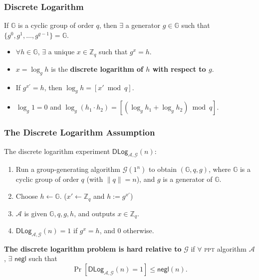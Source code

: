 \begin{frame}\frametitle{Discrete Logarithm}
If $\mathbb{G}$ is a cyclic group of order $q$, then $\exists$ a generator $g \in \mathbb{G}$ such that $\{ g^0,g^1,\dotsc,g^{q-1}\} = \mathbb{G}$.
\begin{itemize}
\item $\forall h \in \mathbb{G}$, $\exists$ a unique $x \in \mathbb{Z}_q$ such that $g^x = h$.
\item $x= \log_gh$ is the \textbf{\textbf{discrete logarithm} of $h$ with respect to $g$}.
\item If $g^{x'}=h$, then $\log_gh = [x' \bmod q]$.
\item $\log_g1=0$ and $\log_g(h_1\cdot h_2) = [(\log_gh_1+\log_gh_2) \bmod q]$.
\end{itemize}
\end{frame}
\begin{frame}\frametitle{The Discrete Logarithm Assumption}
The discrete logarithm experiment $\mathsf{DLog}_{\mathcal{A},\mathcal{G}}(n)$:
\begin{enumerate}
\item Run a group-generating algorithm $\mathcal{G}(1^n)$ to obtain $(\mathbb{G},q,g)$, where $\mathbb{G}$ is a cyclic group of order $q$ (with $\|q\|=n$), and $g$ is a generator of $\mathbb{G}$.
\item Choose $h \gets \mathbb{G}$. ($x' \gets \mathbb{Z}_q$ and $h := g^{x'}$)
\item $\mathcal{A}$ is given $\mathbb{G}, q, g, h$, and outputs $x \in \mathbb{Z}_q$.
\item $\mathsf{DLog}_{\mathcal{A},\mathcal{G}}(n) = 1$ if $g^x = h$, and 0 otherwise. 
\end{enumerate}
\begin{definition}
\textbf{The discrete logarithm problem is hard relative to} $\mathcal{G}$ if $\forall$ \textsc{ppt} algorithm $\mathcal{A}$, $\exists$ $\mathsf{negl}$ such that
\[ \Pr[\mathsf{DLog}_{\mathcal{A},\mathcal{G}}(n)=1] \le \mathsf{negl}(n).\]
\end{definition}
\end{frame}

